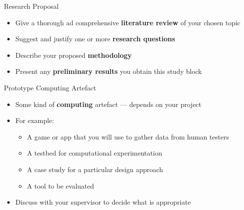 \begin{frame}{Research Proposal}
	\begin{itemize}
		\pause\item Give a thorough ad comprehensive \textbf{literature review} of your chosen topic
		\pause\item Suggest and justify one or more \textbf{research questions}
		\pause\item Describe your proposed \textbf{methodology}
		\pause\item Present any \textbf{preliminary results} you obtain this study block
	\end{itemize}
\end{frame}

\begin{frame}{Prototype Computing Artefact}
	\begin{itemize}
		\pause\item Some kind of \textbf{computing} artefact --- depends on your project
		\pause\item For example:
			\begin{itemize}
				\pause\item A game or app that you will use to gather data from human testers
				\pause\item A testbed for computational experimentation
				\pause\item A case study for a particular design approach
				\pause\item A tool to be evaluated
			\end{itemize}
		\pause\item Discuss with your supervisor to decide what is appropriate
	\end{itemize}
\end{frame}

